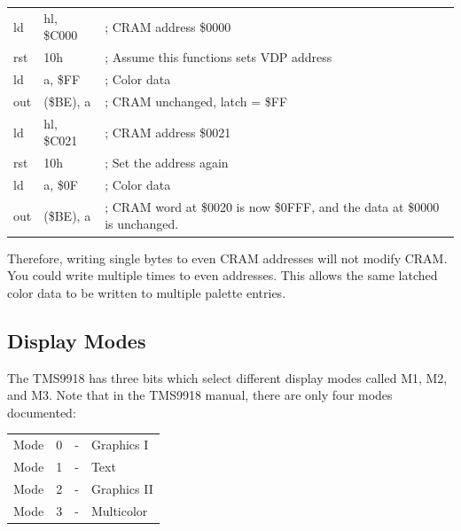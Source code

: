 \documentclass{article}
\begin{document}
\begin{table}[H]
    \centering
    \selectfont
    \begin{tabular}{p{1cm} p{1in} p{3.5in}}
        ld  &  hl, \$C000   & ; CRAM address \$0000                     \\
        rst &  10h          & ; Assume this functions sets VDP address  \\
        ld  &  a, \$FF      & ; Color data                              \\
        out &  (\$BE), a    & ; CRAM unchanged, latch = \$FF            \\
        ld  &  hl, \$C021   & ; CRAM address \$0021                     \\
        rst &  10h          & ; Set the address again                   \\
        ld  &  a, \$0F      & ; Color data                              \\
        out &  (\$BE), a    & ; CRAM word at \$0020 is now \$0FFF,
                                and the data at \$0000 is unchanged.    \\
    \end{tabular}
    \fontfamily{}\selectfont
\end{table}

Therefore, writing single bytes to even CRAM addresses will not modify CRAM.
You could write multiple times to even addresses. This allows the same latched
color data to be written to multiple palette entries.

\subsection{Display Modes}

The TMS9918 has three bits which select different display modes called M1, M2,
and M3. Note that in the TMS9918 manual, there are only four modes documented:

\begin{table}[H]
    \centering
    \begin{tabular}{l c c l}
        Mode & 0 & - & Graphics I   \\
        Mode & 1 & - & Text         \\
        Mode & 2 & - & Graphics II  \\
        Mode & 3 & - & Multicolor   \\
    \end{tabular}
\end{table}
\end{document}

